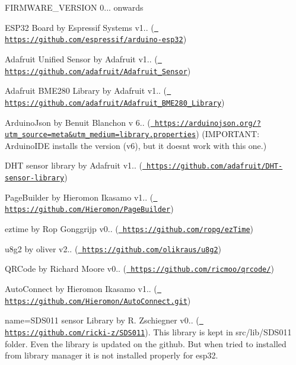 \begin{DoxyEnumerate}
\item F\+I\+R\+M\+W\+A\+R\+E\+\_\+\+V\+E\+R\+S\+I\+ON 0... onwards
\begin{DoxyItemize}
\item E\+S\+P32 Board by Espressif Systems v1.. (\href{https://github.com/espressif/arduino-esp32}{\texttt{ https\+://github.\+com/espressif/arduino-\/esp32}})
\item Adafruit Unified Sensor by Adafruit v1.. (\href{https://github.com/adafruit/Adafruit_Sensor}{\texttt{ https\+://github.\+com/adafruit/\+Adafruit\+\_\+\+Sensor}})
\item Adafruit B\+M\+E280 Library by Adafruit v1.. (\href{https://github.com/adafruit/Adafruit_BME280_Library}{\texttt{ https\+://github.\+com/adafruit/\+Adafruit\+\_\+\+B\+M\+E280\+\_\+\+Library}})
\item Arduino\+Json by Benuit Blanchon v 6.. (\href{https://arduinojson.org/?utm_source=meta&utm_medium=library.properties}{\texttt{ https\+://arduinojson.\+org/?utm\+\_\+source=meta\&utm\+\_\+medium=library.\+properties}}) (I\+M\+P\+O\+R\+T\+A\+NT\+: Arduino\+I\+DE installs the version (v6), but it doesnt work with this one.)
\item D\+HT sensor library by Adafruit v1.. (\href{https://github.com/adafruit/DHT-sensor-library}{\texttt{ https\+://github.\+com/adafruit/\+D\+H\+T-\/sensor-\/library}})
\item Page\+Builder by Hieromon Ikasamo v1.. (\href{https://github.com/Hieromon/PageBuilder}{\texttt{ https\+://github.\+com/\+Hieromon/\+Page\+Builder}})
\item eztime by Rop Gonggrijp v0.. (\href{https://github.com/ropg/ezTime}{\texttt{ https\+://github.\+com/ropg/ez\+Time}})
\item u8g2 by oliver v2.. (\href{https://github.com/olikraus/u8g2}{\texttt{ https\+://github.\+com/olikraus/u8g2}})
\item Q\+R\+Code by Richard Moore v0.. (\href{https://github.com/ricmoo/qrcode/}{\texttt{ https\+://github.\+com/ricmoo/qrcode/}})
\item Auto\+Connect by Hieromon Ikasamo v1.. (\href{https://github.com/Hieromon/AutoConnect.git}{\texttt{ https\+://github.\+com/\+Hieromon/\+Auto\+Connect.\+git}})
\item name=S\+D\+S011 sensor Library by R. Zschiegner v0.. (\href{https://github.com/ricki-z/SDS011}{\texttt{ https\+://github.\+com/ricki-\/z/\+S\+D\+S011}}). This library is kept in src/lib/\+S\+D\+S011 folder. Even the library is updated on the github. But when tried to installed from library manager it is not installed properly for esp32.

\end{DoxyItemize}
\end{DoxyEnumerate}
